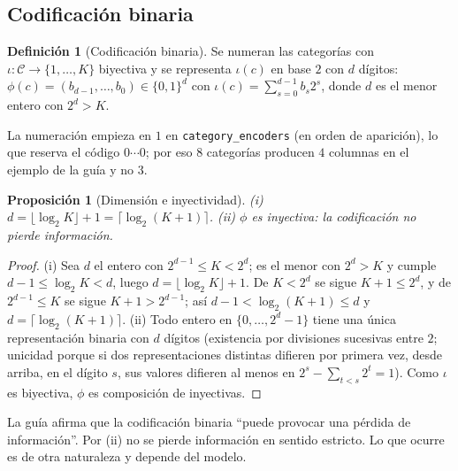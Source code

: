 \documentclass[11pt]{article}
\newtheorem{proposicion}[teorema]{Proposición}
\theoremstyle{definition}
\newtheorem{definicion}[teorema]{Definición}
\theoremstyle{remark}
\begin{document}
\subsection{Codificación binaria}\label{sec:binaria}

\begin{definicion}[Codificación binaria]\label{def:binaria}
\noindent Se numeran las categorías con $\iota:\mathcal{C}\to\{1,\dots,K\}$ biyectiva y se representa $\iota(c)$ en base $2$ con $d$ dígitos: $\phi(c)=(b_{d-1},\dots,b_0)\in\{0,1\}^d$ con $\iota(c)=\sum_{s=0}^{d-1}b_s2^s$, donde $d$ es el menor entero con $2^d>K$.
\end{definicion}

\noindent La numeración empieza en $1$ en \texttt{category\_encoders} (en orden de aparición), lo que reserva el código $0\cdots0$; por eso $8$ categorías producen $4$ columnas en el ejemplo de la guía y no $3$.

\begin{proposicion}[Dimensión e inyectividad]\label{prop:binaria}
\noindent (i) $d=\lfloor\log_2K\rfloor+1=\lceil\log_2(K+1)\rceil$. (ii) $\phi$ es inyectiva: la codificación no pierde información.
\end{proposicion}
\begin{proof}
\noindent (i) Sea $d$ el entero con $2^{d-1}\le K<2^d$; es el menor con $2^d>K$ y cumple $d-1\le\log_2K<d$, luego $d=\lfloor\log_2K\rfloor+1$. De $K<2^d$ se sigue $K+1\le2^d$, y de $2^{d-1}\le K$ se sigue $K+1>2^{d-1}$; así $d-1<\log_2(K+1)\le d$ y $d=\lceil\log_2(K+1)\rceil$. (ii) Todo entero en $\{0,\dots,2^d-1\}$ tiene una única representación binaria con $d$ dígitos (existencia por divisiones sucesivas entre $2$; unicidad porque si dos representaciones distintas difieren por primera vez, desde arriba, en el dígito $s$, sus valores difieren al menos en $2^s-\sum_{t<s}2^t=1$). Como $\iota$ es biyectiva, $\phi$ es composición de inyectivas.
\end{proof}

\noindent La guía afirma que la codificación binaria ``puede provocar una pérdida de información''. Por (ii) no se pierde información en sentido estricto. Lo que ocurre es de otra naturaleza y depende del modelo.
\end{document}
